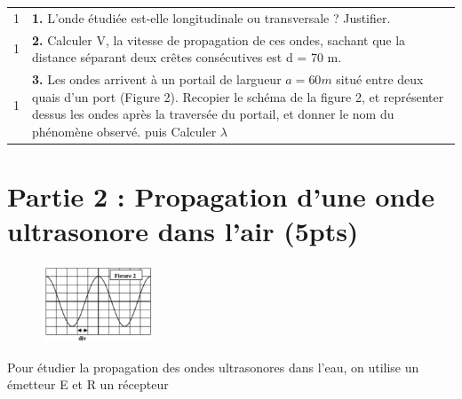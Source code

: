 \documentclass[12pt]{article}
\begin{document}
\begin{tabular}{c|l}
 1 &\textbf{1. }L’onde étudiée est-elle longitudinale ou transversale ? Justifier.\\

 1& \makecell[l]{\textbf{2. }Calculer V, la vitesse de propagation de ces ondes, sachant
 que la \\distance séparant deux crêtes consécutives est d = 70 m.}\\

	 1 & \makecell[l]{\textbf{3. }Les ondes arrivent à un portail de largueur $a = 60 m$ situé entre
	 deux\\quais d’un port (Figure 2). Recopier le schéma de la figure 2, et représenter dessus\\les ondes après la traversée du portail, \\et donner le nom du phénomène observé. puis Calculer $\lambda$}\\
\end{tabular}
\section*{Partie 2 :  Propagation d’une onde ultrasonore dans l’air \dotfill(5pts)}
\begin{figure}
  \begin{center}
	  \vspace{-1.5cm}
	\includegraphics[width=0.29\textwidth]{./img/ex7_1.png}
  \end{center}
\end{figure}


Pour étudier la propagation des ondes ultrasonores dans l’eau, on utilise un émetteur E et R un récepteur
\end{document}
